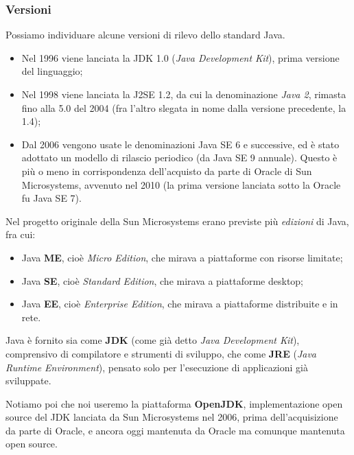 \documentclass[a4paper,11pt]{article}
\begin{document}
\subsubsection{Versioni}
Possiamo individuare alcune versioni di rilevo dello standard Java.
\begin{itemize}
	\item Nel 1996 viene lanciata la JDK 1.0 (\textit{Java Development Kit}), prima versione del linguaggio;
	\item Nel 1998 viene lanciata la J2SE 1.2, da cui la denominazione \textit{Java 2}, rimasta fino alla 5.0 del 2004 (fra l'altro slegata in nome dalla versione precedente, la 1.4);
	\item Dal 2006 vengono usate le denominazioni Java SE 6 e successive, ed è stato adottato un modello di rilascio periodico (da Java SE 9 annuale).
		Questo è più o meno in corrispondenza dell'acquisto da parte di Oracle di Sun Microsystems, avvenuto nel 2010 (la prima versione lanciata sotto la Oracle fu Java SE 7).
\end{itemize}

Nel progetto originale della Sun Microsystems erano previste più \textit{edizioni} di Java, fra cui:
\begin{itemize}
	\item Java \textbf{ME}, cioè \textit{Micro Edition}, che mirava a piattaforme con risorse limitate;
	\item Java \textbf{SE}, cioè \textit{Standard Edition}, che mirava a piattaforme desktop;
	\item Java \textbf{EE}, cioè \textit{Enterprise Edition}, che mirava a piattaforme distribuite e in rete.
\end{itemize}

Java è fornito sia come \textbf{JDK} (come già detto \textit{Java Development Kit}), comprensivo di compilatore e strumenti di sviluppo, che come \textbf{JRE} (\textit{Java Runtime Environment}), pensato solo per l'esecuzione di applicazioni già sviluppate.

Notiamo poi che noi useremo la piattaforma \textbf{OpenJDK}, implementazione open source del JDK lanciata da Sun Microsystems nel 2006, prima dell'acquisizione da parte di Oracle, e ancora oggi mantenuta da Oracle ma comunque mantenuta open source. 
\end{document}
